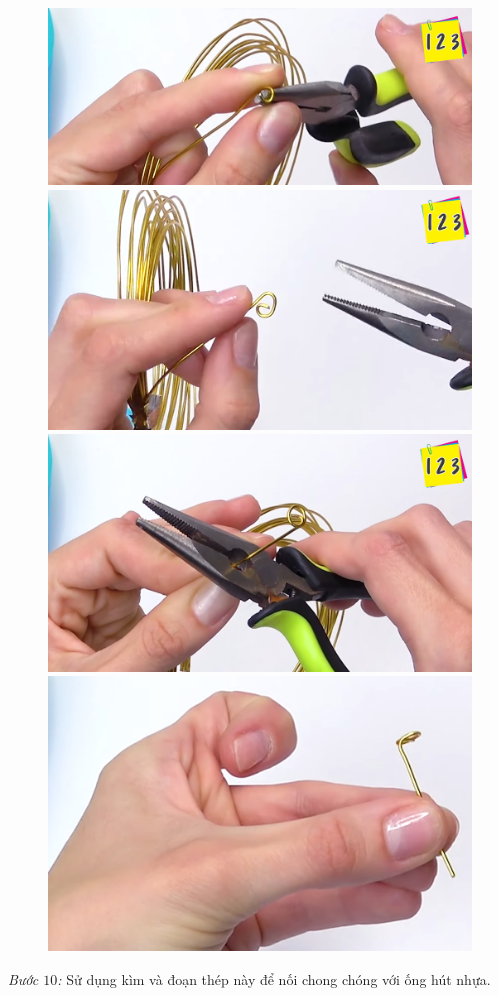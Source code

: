 \begin{multicols}{2}
\begin{figure}[H]
		\includegraphics[width= 0.75\linewidth]{9b}
		\includegraphics[width= 0.75\linewidth]{9c}
		\includegraphics[width= 0.75\linewidth]{9d}
		\includegraphics[width= 0.75\linewidth]{9e}
		\vspace*{-10pt}
	\end{figure}
	\textit{Bước $10$:} Sử dụng kìm và đoạn thép này để nối chong chóng với ống hút nhựa.
	\begin{figure}[H]

\end{figure}
\end{multicols}
